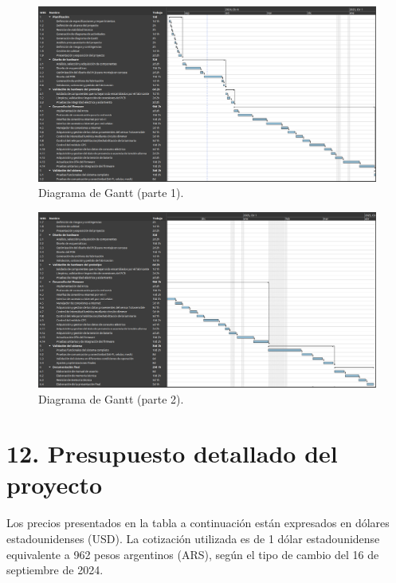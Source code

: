 \documentclass[
11pt, %
]{charter}
\begin{document}
\begin{landscape}
\begin{figure}[htpb]
\centering 
\includegraphics[height=.8\textheight]{./Figuras/Gantt-1.png}
\caption{Diagrama de Gantt (parte 1).} %
\label{fig:diagGantt-1}
\end{figure}

\end{landscape}

\begin{landscape}
\begin{figure}[htpb]
\centering 
\includegraphics[height=.8\textheight]{./Figuras/Gantt-2.png}
\caption{Diagrama de Gantt (parte 2).} %
\label{fig:diagGantt-2}
\end{figure}

\end{landscape}


\section{12. Presupuesto detallado del proyecto}
\label{sec:presupuesto}

Los precios presentados en la tabla a continuación están expresados en dólares estadounidenses (USD). La cotización utilizada es de 1 dólar estadounidense equivalente a 962 pesos argentinos (ARS), según el tipo de cambio del 16 de septiembre de 2024.
\end{document}
